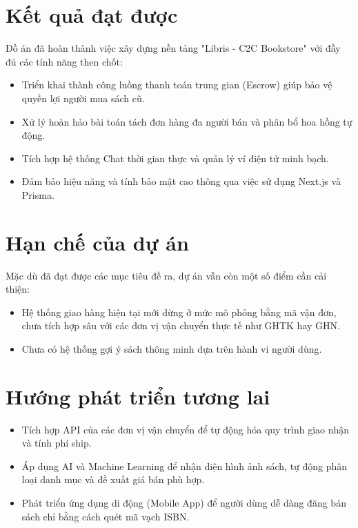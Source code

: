 \documentclass[../main.tex]{subfiles}
\begin{document}
\section{Kết quả đạt được}
Đồ án đã hoàn thành việc xây dựng nền tảng "Libris - C2C Bookstore" với đầy đủ các tính năng then chốt:
\begin{itemize}
    \item Triển khai thành công luồng thanh toán trung gian (Escrow) giúp bảo vệ quyền lợi người mua sách cũ.
    \item Xử lý hoàn hảo bài toán tách đơn hàng đa người bán và phân bổ hoa hồng tự động.
    \item Tích hợp hệ thống Chat thời gian thực và quản lý ví điện tử minh bạch.
    \item Đảm bảo hiệu năng và tính bảo mật cao thông qua việc sử dụng Next.js và Prisma.
\end{itemize}

\section{Hạn chế của dự án}
Mặc dù đã đạt được các mục tiêu đề ra, dự án vẫn còn một số điểm cần cải thiện:
\begin{itemize}
    \item Hệ thống giao hàng hiện tại mới dừng ở mức mô phỏng bằng mã vận đơn, chưa tích hợp sâu với các đơn vị vận chuyển thực tế như GHTK hay GHN.
    \item Chưa có hệ thống gợi ý sách thông minh dựa trên hành vi người dùng.
\end{itemize}

\section{Hướng phát triển tương lai}
\begin{itemize}
    \item Tích hợp API của các đơn vị vận chuyển để tự động hóa quy trình giao nhận và tính phí ship.
    \item Áp dụng AI và Machine Learning để nhận diện hình ảnh sách, tự động phân loại danh mục và đề xuất giá bán phù hợp.
    \item Phát triển ứng dụng di động (Mobile App) để người dùng dễ dàng đăng bán sách chỉ bằng cách quét mã vạch ISBN.
\end{itemize}
\end{document}
